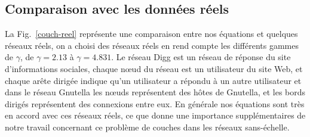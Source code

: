 \subsection{Comparaison avec les données réels}
La Fig.~\ref{couch-reel} représente une comparaison entre nos équations et quelques réseaux réels, on a choisi des réseaux réels en rend compte les différents gammes de $\gamma$, de $\gamma=2.13$ à $\gamma=4.831$.
Le réseau Digg est un réseau de réponse du site d'informations sociales, chaque nœud du réseau est un utilisateur du site Web, et chaque arête dirigée indique qu'un utilisateur a répondu à un autre utilisateur et dans le réseau Gnutella les nœuds représentent des hôtes de Gnutella, et les bords dirigés représentent des connexions entre eux. En générale nos équations sont très en accord avec ces réseaux réels, ce que donne une importance supplémentaires de notre travail concernant ce problème de couches dans les réseaux sans-échelle. 


